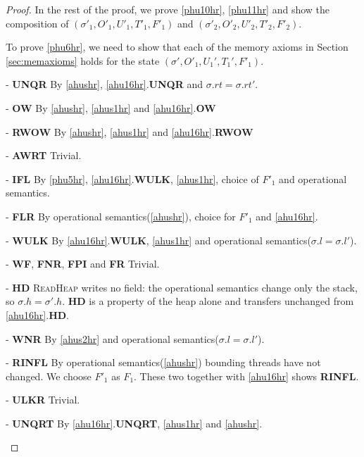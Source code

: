 \begin{proof}
In the rest of the proof, we prove \ref{phu10hr}, \ref{phu11hr} and show the composition of $(\sigma'_1, O'_1, U'_1,T'_1,F'_1)$ and  $(\sigma'_2, O'_2, U'_2,T'_2,F'_2)$. 

To prove \ref{phu6hr}, we need to show that each of the memory axioms in Section \ref{sec:memaxioms} holds for the state $(\sigma',O'_1,U_1',T_1',F'_1)$.
\begin{case} - \textbf{UNQR} By \ref{ahushr}, \ref{ahu16hr}.\textbf{UNQR} and $\sigma.rt = \sigma.rt'$.
\end{case}
\begin{case} - \textbf{OW} By \ref{ahushr}, \ref{ahus1hr} and \ref{ahu16hr}.\textbf{OW}
\end{case}
\begin{case} - \textbf{RWOW} By \ref{ahushr}, \ref{ahus1hr} and \ref{ahu16hr}.\textbf{RWOW}
\end{case}
\begin{case} - \textbf{AWRT} Trivial. 
\end{case}
\begin{case} - \textbf{IFL}  By \ref{phu5hr}, \ref{ahu16hr}.\textbf{WULK}, \ref{ahus1hr}, choice of $F'_1$ and operational semantics.
\end{case}
\begin{case} - \textbf{FLR}  By operational semantics(\ref{ahushr}), choice for $F'_1$ and \ref{ahu16hr}. 
\end{case}
\begin{case} - \textbf{WULK}  By \ref{ahu16hr}.\textbf{WULK}, \ref{ahus1hr} and operational semantics($\sigma.l = \sigma.l'$).
\end{case}
\begin{case} - \textbf{WF}, \textbf{FNR}, \textbf{FPI} and \textbf{FR} Trivial.
\end{case}
\begin{case} - \textbf{HD}
\textsc{ReadHeap} writes no field: the operational semantics change only the
stack, so $\sigma.h = \sigma'.h$.  \textbf{HD} is a property of the heap alone
and transfers unchanged from \ref{ahu16hr}.\textbf{HD}.
\end{case}
\begin{case} - \textbf{WNR} By \ref{ahus2hr} and operational semantics($\sigma.l = \sigma.l'$).
\end{case}
\begin{case} - \textbf{RINFL} By operational semantics(\ref{ahushr}) bounding threads have not changed. We choose $F'_1$ as $F_1$. These two together with \ref{ahu16hr} shows \textbf{RINFL}. 
\end{case}
\begin{case} - \textbf{ULKR} Trivial. 
\end{case}
\begin{case} - \textbf{UNQRT}  By \ref{ahu16hr}.\textbf{UNQRT}, \ref{ahus1hr} and \ref{ahushr}.
\end{case}


\end{proof}
